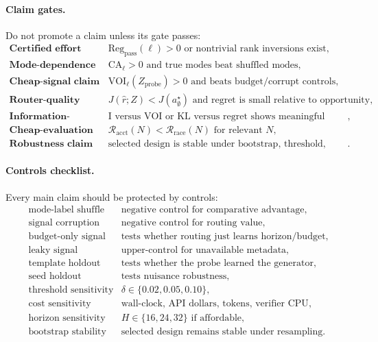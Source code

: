 \documentclass{article}
\begin{document}
\paragraph{Claim gates.}
Do not promote a claim unless its gate passes:
\[
\begin{array}{ll}
    \textbf{Certified effort claim} &
    \mathrm{Reg}_{\mathrm{pass}}(\ell)>0
    \text{ or nontrivial rank inversions exist},\\
    \textbf{Mode-dependence claim} &
    \mathrm{CA}_\ell>0
    \text{ and true modes beat shuffled modes},\\
    \textbf{Cheap-signal claim} &
    \mathrm{VOI}_\ell(Z_{\mathrm{probe}})>0
    \text{ and beats budget/corrupt controls},\\
    \textbf{Router-quality claim} &
    J(\hat r;Z)<J(a^\star_{\emptyset})
    \text{ and regret is small relative to opportunity},\\
    \textbf{Information-diagnostic claim} &
    \text{I versus VOI or KL versus regret shows meaningful decoupling},\\
    \textbf{Cheap-evaluation claim} &
    \mathcal R_{\mathrm{acct}}(N)<\mathcal R_{\mathrm{race}}(N)
    \text{ for relevant }N,\\
    \textbf{Robustness claim} &
    \text{selected design is stable under bootstrap, threshold, cost, and mode-taxonomy changes}.
\end{array}
\]

\paragraph{Controls checklist.}
Every main claim should be protected by controls:
\[
\begin{array}{ll}
    \text{mode-label shuffle} & \text{negative control for comparative advantage},\\
    \text{signal corruption} & \text{negative control for routing value},\\
    \text{budget-only signal} & \text{tests whether routing just learns horizon/budget},\\
    \text{leaky signal} & \text{upper-control for unavailable metadata},\\
    \text{template holdout} & \text{tests whether the probe learned the generator},\\
    \text{seed holdout} & \text{tests nuisance robustness},\\
    \text{threshold sensitivity} & \delta\in\{0.02,0.05,0.10\},\\
    \text{cost sensitivity} & \text{wall-clock, API dollars, tokens, verifier CPU},\\
    \text{horizon sensitivity} & H\in\{16,24,32\}\text{ if affordable},\\
    \text{bootstrap stability} & \text{selected design remains stable under resampling}.
\end{array}
\]
\end{document}
